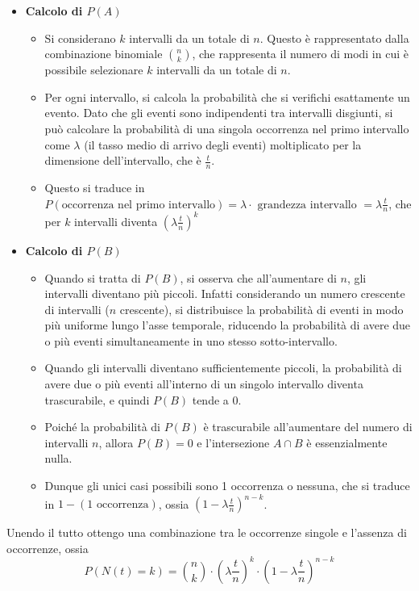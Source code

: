 \documentclass[11pt]{report}
\begin{document}
\begin{itemize}
	\item \textbf{Calcolo di $P(A)$}
	\begin{itemize}
		\item Si considerano $k$ intervalli da un totale di $n$. Questo è rappresentato dalla combinazione binomiale $\binom{n}{k}$, che rappresenta il numero di modi in cui è possibile selezionare $k$ intervalli da un totale di $n$.
		\item Per ogni intervallo, si calcola la probabilità che si verifichi esattamente un evento. Dato che gli eventi sono indipendenti tra intervalli disgiunti, si può calcolare la probabilità di una singola occorrenza nel primo intervallo come $\lambda$ (il tasso medio di arrivo degli eventi) moltiplicato per la dimensione dell'intervallo, che è $\frac{t}{n}$.
		\item Questo si traduce in $P(\text{occorrenza nel primo intervallo}) = \lambda \cdot \text{ grandezza intervallo } = \lambda \frac{t}{n}$, che per $k$ intervalli diventa $\left( \lambda \frac{t}{n} \right)^k$
	\end{itemize}
	\item \textbf{Calcolo di $P(B)$}
	\begin{itemize}
		\item Quando si tratta di $P(B)$, si osserva che all'aumentare di $n$, gli intervalli diventano più piccoli. Infatti considerando un numero crescente di intervalli ($n$ crescente), si distribuisce la probabilità di eventi in modo più uniforme lungo l'asse temporale, riducendo la probabilità di avere due o più eventi simultaneamente in uno stesso sotto-intervallo.
		\item Quando gli intervalli diventano sufficientemente piccoli, la probabilità di avere due o più eventi all'interno di un singolo intervallo diventa trascurabile, e quindi $P(B)$ tende a $0$.
		\item Poiché la probabilità di $P(B)$ è trascurabile all'aumentare del numero di intervalli $n$, allora $P(B)=0$ e l'intersezione $A \cap B$ è essenzialmente nulla.
		\item Dunque gli unici casi possibili sono 1 occorrenza o nessuna, che si traduce in $1 - (\text{1 occorrenza})$, ossia $\left( 1 - \lambda \frac{t}{n} \right)^{n-k}$.
	\end{itemize}
\end{itemize}
Unendo il tutto ottengo una combinazione tra le occorrenze singole e l'assenza di occorrenze, ossia
\begin{equation}
	P(N(t)=k) = \binom{n}{k} \cdot \left( \lambda \frac{t}{n} \right)^k \cdot \left( 1 - \lambda \frac{t}{n} \right)^{n-k}
\end{equation}
\end{document}
